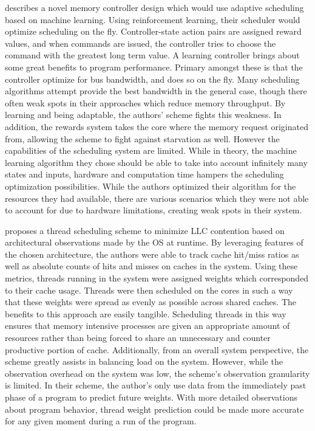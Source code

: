 \documentclass[12pt, a4paper]{llncs}
\begin{document}
\cite{Ipek:2008:SMC:1381306.1382172} describes a novel memory controller design
 which would use adaptive 
scheduling based on machine learning. Using reinforcement learning, their 
scheduler would optimize scheduling on the fly. Controller-state action pairs 
are assigned reward values, and when commands are issued, the controller tries 
to choose the command with the greatest long term value. A learning controller 
brings about some great benefits to program performance. Primary amongst these 
is that the controller optimize for bus bandwidth, and does so on the fly. Many 
scheduling algorithms attempt provide the best bandwidth in the general case, 
though there often weak spots in their approaches which reduce memory 
throughput. By learning and being adaptable, the authors’ scheme fights this 
weakness. In addition, the rewards system takes the core where the memory 
request originated from, allowing the scheme to fight against starvation as 
well. However the capabilities of the scheduling system are limited. While in 
theory, the machine learning algorithm they chose should be able to take into 
account infinitely many states and inputs, hardware and computation time hampers
 the scheduling optimization possibilities. While the authors optimized their 
algorithm for the resources they had available, there are various scenarios 
which they were not able to account for due to hardware limitations, creating 
weak spots in their system.

\cite{10.1109/MM.2008.48} proposes a thread scheduling scheme to minimize LLC contention based 
on architectural observations made by the OS at runtime. By leveraging features 
of the chosen architecture, the authors were able to track cache hit/miss ratios
 as well as absolute counts of hits and misses on caches in the system. Using 
these metrics, threads running in the system were assigned weights which 
corresponded to their cache usage. Threads were then scheduled on the cores in 
such a way that these weights were spread as evenly as possible across shared 
caches. The benefits to this approach are easily tangible. Scheduling threads 
in this way ensures that memory intensive processes are given an appropriate 
amount of resources rather than being forced to share an unnecessary and counter
productive portion of cache. Additionally, from an overall system perspective, 
the scheme greatly assists in balancing load on the system.  However, while the 
observation overhead on the system was low, the scheme’s observation granularity
 is limited. In their scheme, the author’s only use data from the immediately 
past phase of a program to predict future weights. With more detailed 
observations about program behavior, thread weight prediction could be made more
 accurate for any given moment during a run of the program. 



\end{document}

